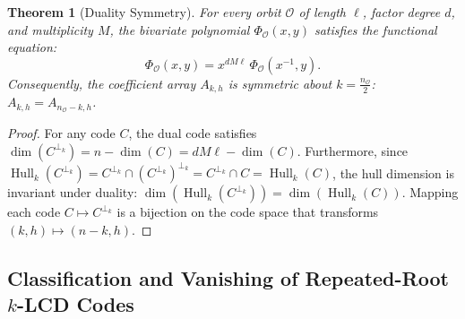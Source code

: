 \documentclass[preprint,12pt]{elsarticle}
\numberwithin{equation}{section}
\theoremstyle{plain}
\newtheorem{theorem}{Theorem}[section]
\theoremstyle{definition}
\theoremstyle{remark}
\begin{document}
\begin{theorem}[Duality Symmetry]\label{thm:duality_symmetry}
For every orbit $\mathcal{O}$ of length $\ell$, factor degree $d$, and multiplicity $M$, the bivariate polynomial $\Phi_{\mathcal{O}}(x, y)$ satisfies the functional equation:
\begin{equation}
    \Phi_{\mathcal{O}}(x, y) = x^{d M \ell} \, \Phi_{\mathcal{O}}(x^{-1}, y).
\end{equation}
Consequently, the coefficient array $A_{k, h}$ is symmetric about $k = \frac{n_{\mathcal{O}}}{2}$: $A_{k, h} = A_{n_{\mathcal{O}} - k, h}$.
\end{theorem}
\begin{proof}
For any code $C$, the dual code satisfies $\dim(C^{\perp_k}) = n - \dim(C) = d M \ell - \dim(C)$. Furthermore, since $\operatorname{Hull}_k(C^{\perp_k}) = C^{\perp_k} \cap (C^{\perp_k})^{\perp_k} = C^{\perp_k} \cap C = \operatorname{Hull}_k(C)$, the hull dimension is invariant under duality: $\dim(\operatorname{Hull}_k(C^{\perp_k})) = \dim(\operatorname{Hull}_k(C))$. Mapping each code $C \mapsto C^{\perp_k}$ is a bijection on the code space that transforms $(k, h) \mapsto (n - k, h)$.
\end{proof}

\subsection{Classification and Vanishing of Repeated-Root \texorpdfstring{$k$}{k}-LCD Codes}
\end{document}
